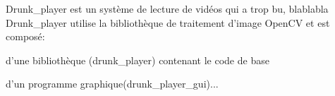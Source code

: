 Drunk\+\_\+player est un système de lecture de vidéos qui a trop bu, blablabla Drunk\+\_\+player utilise la bibliothèque de traitement d'image Open\+C\+V et est composé\+:
\begin{DoxyItemize}
\item d'une bibliothèque (drunk\+\_\+player) contenant le code de base
\item d'un programme graphique(drunk\+\_\+player\+\_\+gui)... 
\end{DoxyItemize}